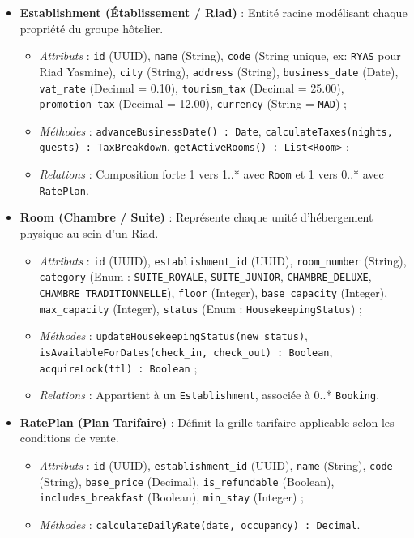 \documentclass[12pt,a4paper,oneside]{report}
\begin{document}
\begin{itemize}
    \item \textbf{Establishment (Établissement / Riad)} : Entité racine modélisant chaque propriété du groupe hôtelier.
    \begin{itemize}
        \item \textit{Attributs} : \texttt{id} (UUID), \texttt{name} (String), \texttt{code} (String unique, ex: \texttt{RYAS} pour Riad Yasmine), \texttt{city} (String), \texttt{address} (String), \texttt{business\_date} (Date), \texttt{vat\_rate} (Decimal = 0.10), \texttt{tourism\_tax} (Decimal = 25.00), \texttt{promotion\_tax} (Decimal = 12.00), \texttt{currency} (String = \texttt{MAD}) ;
        \item \textit{Méthodes} : \texttt{advanceBusinessDate() : Date}, \texttt{calculateTaxes(nights, guests) : TaxBreakdown}, \texttt{getActiveRooms() : List<Room>} ;
        \item \textit{Relations} : Composition forte 1 vers 1..* avec \texttt{Room} et 1 vers 0..* avec \texttt{RatePlan}.
    \end{itemize}
    
    \item \textbf{Room (Chambre / Suite)} : Représente chaque unité d'hébergement physique au sein d'un Riad.
    \begin{itemize}
        \item \textit{Attributs} : \texttt{id} (UUID), \texttt{establishment\_id} (UUID), \texttt{room\_number} (String), \texttt{category} (Enum : \texttt{SUITE\_ROYALE}, \texttt{SUITE\_JUNIOR}, \texttt{CHAMBRE\_DELUXE}, \texttt{CHAMBRE\_TRADITIONNELLE}), \texttt{floor} (Integer), \texttt{base\_capacity} (Integer), \texttt{max\_capacity} (Integer), \texttt{status} (Enum : \texttt{HousekeepingStatus}) ;
        \item \textit{Méthodes} : \texttt{updateHousekeepingStatus(new\_status)}, \texttt{isAvailableForDates(check\_in, check\_out) : Boolean}, \texttt{acquireLock(ttl) : Boolean} ;
        \item \textit{Relations} : Appartient à un \texttt{Establishment}, associée à 0..* \texttt{Booking}.
    \end{itemize}

    \item \textbf{RatePlan (Plan Tarifaire)} : Définit la grille tarifaire applicable selon les conditions de vente.
    \begin{itemize}
        \item \textit{Attributs} : \texttt{id} (UUID), \texttt{establishment\_id} (UUID), \texttt{name} (String), \texttt{code} (String), \texttt{base_price} (Decimal), \texttt{is\_refundable} (Boolean), \texttt{includes\_breakfast} (Boolean), \texttt{min\_stay} (Integer) ;
        \item \textit{Méthodes} : \texttt{calculateDailyRate(date, occupancy) : Decimal}.
    \end{itemize}


\end{itemize}
\end{document}
